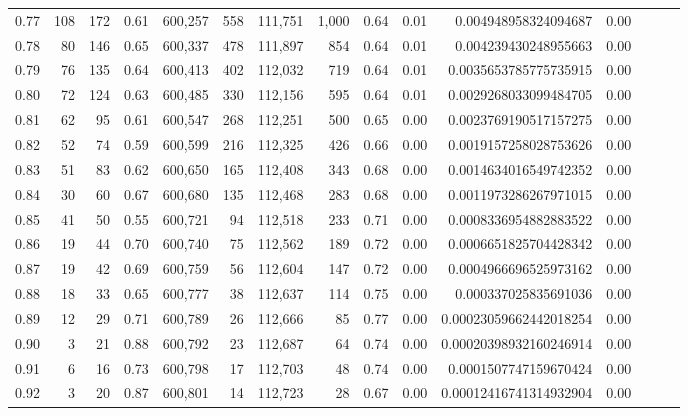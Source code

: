 \begin{tabular}{rrrrrrrrrrrrrrr}
0.77 &     108 &    172 &  0.61 &  600,257 &      558 &  111,751 &    1,000 &  0.64 &  0.01 &    0.004948958324094687 &      0.00 \\
0.78 &      80 &    146 &  0.65 &  600,337 &      478 &  111,897 &      854 &  0.64 &  0.01 &    0.004239430248955663 &      0.00 \\
0.79 &      76 &    135 &  0.64 &  600,413 &      402 &  112,032 &      719 &  0.64 &  0.01 &   0.0035653785775735915 &      0.00 \\
0.80 &      72 &    124 &  0.63 &  600,485 &      330 &  112,156 &      595 &  0.64 &  0.01 &   0.0029268033099484705 &      0.00 \\
0.81 &      62 &     95 &  0.61 &  600,547 &      268 &  112,251 &      500 &  0.65 &  0.00 &   0.0023769190517157275 &      0.00 \\
0.82 &      52 &     74 &  0.59 &  600,599 &      216 &  112,325 &      426 &  0.66 &  0.00 &   0.0019157258028753626 &      0.00 \\
0.83 &      51 &     83 &  0.62 &  600,650 &      165 &  112,408 &      343 &  0.68 &  0.00 &   0.0014634016549742352 &      0.00 \\
0.84 &      30 &     60 &  0.67 &  600,680 &      135 &  112,468 &      283 &  0.68 &  0.00 &   0.0011973286267971015 &      0.00 \\
0.85 &      41 &     50 &  0.55 &  600,721 &       94 &  112,518 &      233 &  0.71 &  0.00 &   0.0008336954882883522 &      0.00 \\
0.86 &      19 &     44 &  0.70 &  600,740 &       75 &  112,562 &      189 &  0.72 &  0.00 &   0.0006651825704428342 &      0.00 \\
0.87 &      19 &     42 &  0.69 &  600,759 &       56 &  112,604 &      147 &  0.72 &  0.00 &   0.0004966696525973162 &      0.00 \\
0.88 &      18 &     33 &  0.65 &  600,777 &       38 &  112,637 &      114 &  0.75 &  0.00 &    0.000337025835691036 &      0.00 \\
0.89 &      12 &     29 &  0.71 &  600,789 &       26 &  112,666 &       85 &  0.77 &  0.00 &  0.00023059662442018254 &      0.00 \\
0.90 &       3 &     21 &  0.88 &  600,792 &       23 &  112,687 &       64 &  0.74 &  0.00 &  0.00020398932160246914 &      0.00 \\
0.91 &       6 &     16 &  0.73 &  600,798 &       17 &  112,703 &       48 &  0.74 &  0.00 &   0.0001507747159670424 &      0.00 \\
0.92 &       3 &     20 &  0.87 &  600,801 &       14 &  112,723 &       28 &  0.67 &  0.00 &  0.00012416741314932904 &      0.00 \\

\end{tabular}
